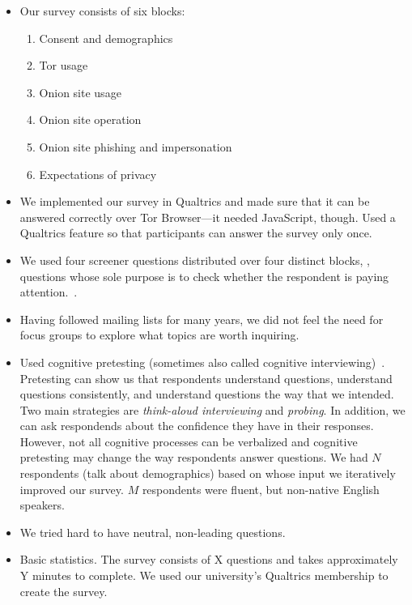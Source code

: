 \begin{itemize}
    \item Our survey consists of six blocks:
        \begin{enumerate}
            \item Consent and demographics
            \item Tor usage
            \item Onion site usage
            \item Onion site operation
            \item Onion site phishing and impersonation
            \item Expectations of privacy
        \end{enumerate}
    \item We implemented our survey in Qualtrics and made sure that it can be
        answered correctly over Tor Browser---it needed JavaScript, though.
        Used a Qualtrics feature so that participants can answer the survey only
        once.
    \item We used four screener questions distributed over four distinct
        blocks, \ie, questions whose sole purpose is to check whether the
        respondent is paying attention.~\cite{Berinsky2014a}.
    \item Having followed mailing lists \etc for many years, we did not feel the
        need for focus groups to explore what topics are worth inquiring.
    \item Used cognitive pretesting (sometimes also called cognitive
        interviewing)~\cite{Collins2003a}.  Pretesting can show us that
        respondents \first understand questions, \second understand questions
        consistently, and \third understand questions the way that we intended.
        Two main strategies are \emph{think-aloud interviewing} and
        \emph{probing}.  In addition, we can ask respondends about the
        confidence they have in their responses.  However, not all cognitive
        processes can be verbalized and cognitive pretesting may change the way
        respondents answer questions.  We had $N$ respondents (talk about
        demographics) based on whose input we iteratively improved our survey.
        $M$ respondents were fluent, but non-native English speakers.
    \item We tried hard to have neutral, non-leading questions.
    \item Basic statistics.  The survey consists of X questions and takes
        approximately Y minutes to complete.  We used our university's
        Qualtrics membership to create the survey.
\end{itemize}


